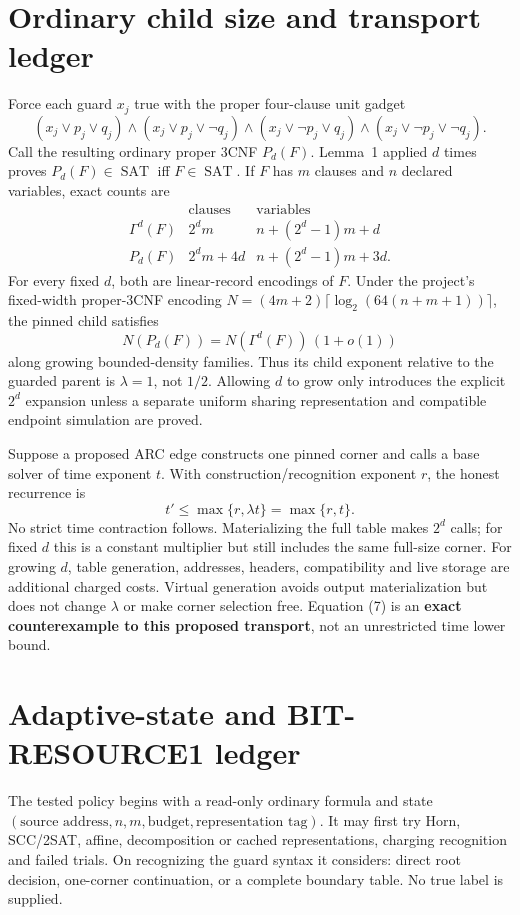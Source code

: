 \documentclass[11pt]{article}
\newcommand{\SAT}{\operatorname{SAT}}
\newcommand{\Gam}{\Gamma}
\begin{document}
\section{Ordinary child size and transport ledger}
Force each guard $x_j$ true with the proper four-clause unit gadget
\[
 (x_j\vee p_j\vee q_j)\wedge(x_j\vee p_j\vee\neg q_j)\wedge
 (x_j\vee\neg p_j\vee q_j)\wedge
 (x_j\vee\neg p_j\vee\neg q_j).                                  \tag{4}
\]
Call the resulting ordinary proper 3CNF $P_d(F)$.  Lemma~1 applied $d$
times proves $P_d(F)\in\SAT$ iff $F\in\SAT$.  If $F$ has $m$ clauses and
$n$ declared variables, exact counts are
\[
\begin{array}{c|cc}
 &\text{clauses}&\text{variables}\\\hline
 \Gam^d(F)&2^dm&n+(2^d-1)m+d\\
 P_d(F)&2^dm+4d&n+(2^d-1)m+3d.
\end{array}                                                       \tag{5}
\]
For every fixed $d$, both are linear-record encodings of $F$.  Under the
project's fixed-width proper-3CNF encoding
$N=(4m+2)\lceil\log_2(64(n+m+1))\rceil$, the pinned child satisfies
\[
 N(P_d(F))=N(\Gam^d(F))\,(1+o(1))                                \tag{6}
\]
along growing bounded-density families.  Thus its child exponent relative
to the guarded parent is $\lambda=1$, not $1/2$.  Allowing $d$ to grow only
introduces the explicit $2^d$ expansion unless a separate uniform sharing
representation and compatible endpoint simulation are proved.

Suppose a proposed ARC edge constructs one pinned corner and calls a base
solver of time exponent $t$.  With construction/recognition exponent $r$,
the honest recurrence is
\[
 t'\le\max\{r,\lambda t\}=\max\{r,t\}.                            \tag{7}
\]
No strict time contraction follows.  Materializing the full table makes
$2^d$ calls; for fixed $d$ this is a constant multiplier but still includes
the same full-size corner.  For growing $d$, table generation, addresses,
headers, compatibility and live storage are additional charged costs.
Virtual generation avoids output materialization but does not change
$\lambda$ or make corner selection free.  Equation (7) is an
\textbf{exact counterexample to this proposed transport}, not an
unrestricted time lower bound.

\section{Adaptive-state and BIT-RESOURCE1 ledger}
The tested policy begins with a read-only ordinary formula and state
$(\text{source address},n,m,\text{budget},\text{representation tag})$.
It may first try Horn, SCC/2SAT, affine, decomposition or cached
representations, charging recognition and failed trials.  On recognizing
the guard syntax it considers: direct root decision, one-corner
continuation, or a complete boundary table.  No true label is supplied.
\end{document}
